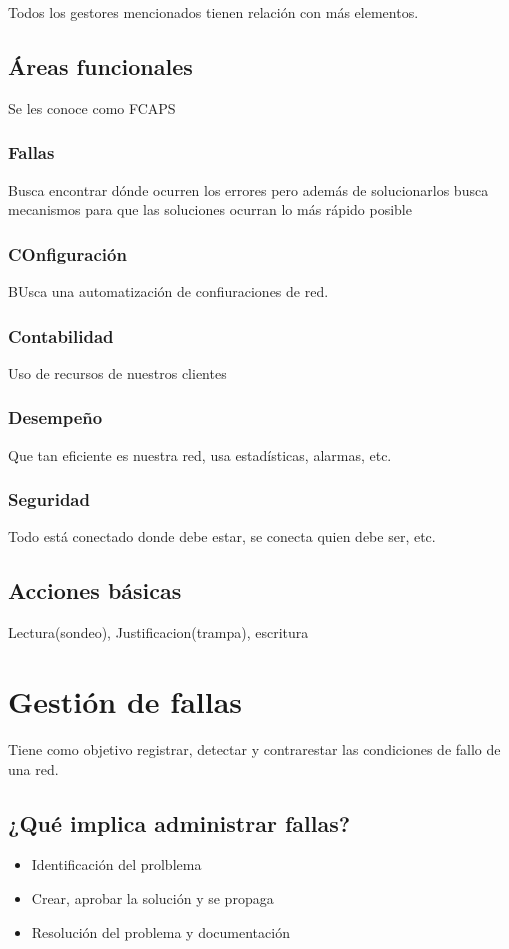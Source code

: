 Todos los gestores mencionados tienen relación con más elementos.\\ 

\section{Áreas funcionales }
Se les conoce como FCAPS 
\subsection{Fallas}
Busca encontrar dónde ocurren los errores pero además de solucionarlos busca mecanismos para que las soluciones ocurran lo más rápido posible 
\subsection{COnfiguración}
BUsca una automatización de confiuraciones de red. 
\subsection{Contabilidad}
Uso de recursos de nuestros clientes 
\subsection{Desempeño}
Que tan eficiente es nuestra red, usa estadísticas, alarmas, etc.
\subsection{Seguridad}
Todo está conectado donde debe estar, se conecta quien debe ser, etc. 

\section{Acciones básicas }
Lectura(sondeo), Justificacion(trampa), escritura

\chapter{Gestión de fallas}
Tiene como objetivo registrar, detectar y contrarestar las condiciones de fallo de una red.

\section{¿Qué implica administrar fallas?}
\begin{itemize}
    \item Identificación del prolblema
    \item Crear, aprobar la solución y se propaga 
    \item Resolución del problema y documentación
\end{itemize}



